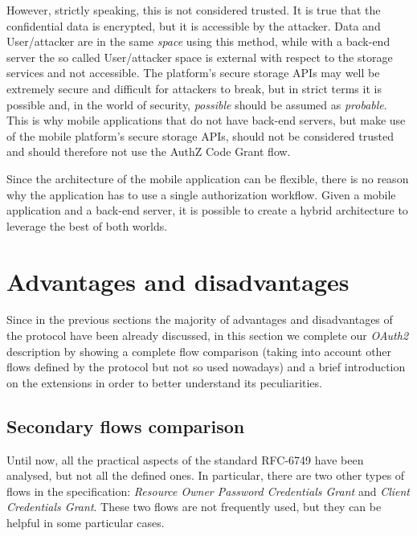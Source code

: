 \documentclass[a4paper,12pt]{article}
\def\oauth{OAuth2\xspace}
\def\rfc#1{RFC-#1\xspace}
\begin{document}
However, strictly speaking, this is not considered trusted. It is true that the confidential data is encrypted, but it is accessible by the attacker. Data and User/attacker are in the same \textit{space} using this method, while with a back-end server the so called User/attacker space is external with respect to the storage services and not accessible. The platform's secure storage APIs may well be extremely secure and difficult for attackers to break, but in strict terms it is possible and, in the world of security, \textit{possible} should be assumed as \textit{probable}. This is why mobile applications that do not have back-end servers, but make use of the mobile platform's secure storage APIs, should not be considered trusted and should therefore not use the AuthZ Code Grant flow.

Since the architecture of the mobile application can be flexible, there is no reason why the application has to use a single authorization workflow. Given a mobile application and a back-end server, it is possible to create a hybrid architecture to leverage the best of both worlds.

\section{Advantages and disadvantages}
Since in the previous sections the majority of advantages and disadvantages of the protocol have been already discussed, in this section we complete our \textit{\oauth} description by showing a complete flow comparison (taking into account other flows defined by the protocol but not so used nowadays) and a brief introduction on the extensions in order to better understand its peculiarities. 

\subsection{Secondary flows comparison}
Until now, all the practical aspects of the standard \rfc{6749} \cite{RFC6749} have been analysed, but not all the defined ones. In particular, there are two other types of flows in the specification: \textit{Resource Owner Password Credentials Grant} and \textit{Client Credentials Grant}. These two flows are not frequently used, but they can be helpful in some particular cases.

\end{document}
